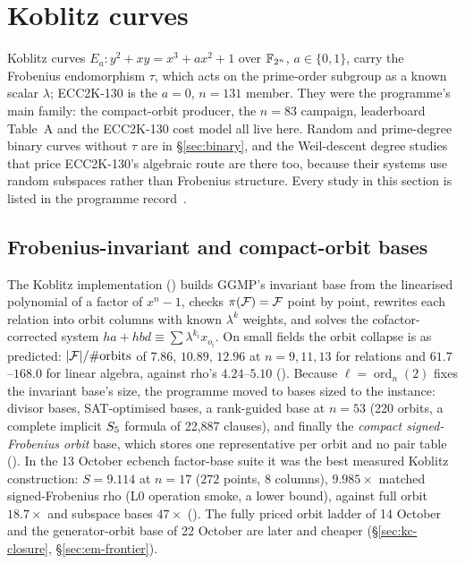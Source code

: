 \chapter{Koblitz curves}\label{sec:koblitz}

Koblitz curves $E_a: y^2+xy=x^3+ax^2+1$ over $\mathbb{F}_{2^n}$, $a\in\{0,1\}$, carry
the Frobenius endomorphism $\tau$, which acts on the prime-order subgroup as
a known scalar $\lambda$; ECC2K-130 is the $a=0$, $n=131$ member. They were
the programme's main family: the compact-orbit producer, the $n=83$
campaign, leaderboard Table~A and the ECC2K-130 cost model all live here.
Random and prime-degree binary curves without $\tau$ are in
\S\ref{sec:binary}, and the Weil-descent degree studies that price
ECC2K-130's algebraic route are there too, because their systems use random
subspaces rather than Frobenius structure. Every study in this section is
listed in the programme record~\cite{icprogram2026}.

\section{Frobenius-invariant and compact-orbit bases}

The Koblitz implementation ()
builds GGMP's invariant base from the linearised polynomial of a factor of
$x^n-1$, checks $\pi(\mathcal{F})=\mathcal{F}$ point by point, rewrites each relation into
orbit columns with known $\lambda^k$ weights, and solves the
cofactor-corrected system $h a+hbd\equiv\sum\lambda^{k_i}x_{o_i}$. On
small fields the orbit collapse is as predicted: $\lvert \mathcal{F} \rvert/\#\text{orbits}$
of $7.86$, $10.89$, $12.96$ at $n=9,11,13$ for relations and
$61.7$--$168.0$ for linear algebra, against rho's $4.24$--$5.10$
(). Because $\ell=\operatorname{ord}_n(2)$
fixes the invariant base's size, the programme moved to bases sized to the
instance: divisor bases, SAT-optimised bases, a rank-guided base at $n=53$
(220 orbits, a complete implicit $S_{5}$ formula of 22{,}887 clauses), and
finally the \emph{compact signed-Frobenius orbit} base, which stores one
representative per orbit and no pair table
(). In the 13 October ecbench
factor-base suite it was the best measured Koblitz construction: $S=9.114$
at $n=17$ ($272$ points, 8 columns), $9.985\times$ matched signed-Frobenius
rho (L0 operation smoke, a lower bound), against full orbit $18.7\times$
and subspace bases $47\times$
(). The fully priced orbit ladder
of 14 October and the generator-orbit base of 22 October are later and
cheaper (\S\ref{sec:kc-closure}, \S\ref{sec:em-frontier}).

